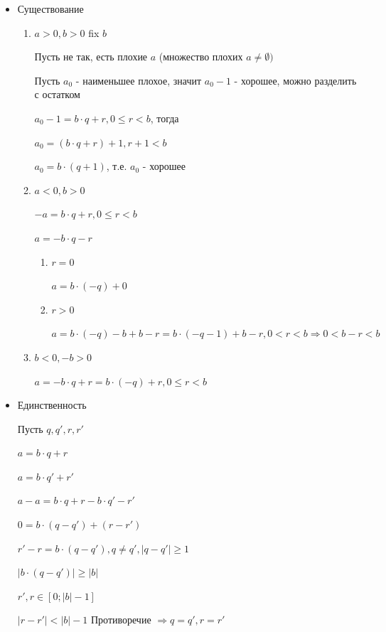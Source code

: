 \documentclass[14pt, letter paper]{article}
\begin{document}
\begin{itemize}
    \item Существование

    \begin{enumerate}
        \item $a > 0, b > 0$ fix $b$

        Пусть не так, есть плохие $a$ (множество плохих $a \neq \emptyset)$

        Пусть $a_0$ - наименьшее плохое, значит $a_0 - 1$ - хорошее, можно разделить с остатком

        $a_0 - 1 = b \cdot q + r, 0 \leq r < b$, тогда 
        
        $a_0 = (b \cdot q + r) + 1, r + 1 < b$

        $a_0 = b \cdot (q + 1)$, т.е. $a_0$ - хорошее

        \item $a < 0, b > 0$

        $-a = b \cdot q + r, 0 \leq r < b$

        $a = -b \cdot q - r$

        \begin{enumerate}
            \item[2.1.] $r = 0$

            $a = b \cdot (-q) + 0$

            \item[2.2.] $r > 0$

            $a = b \cdot (-q) - b + b - r = b \cdot (-q - 1) + b - r, 0 < r < b \Rightarrow 0 < b - r < b$
        \end{enumerate}

        \item $b < 0, -b > 0$

        $a = -b \cdot q + r = b \cdot (-q) + r, 0 \leq r < b$
    \end{enumerate}

    \item Единственность

    Пусть $q, q', r, r'$

    $a = b \cdot q + r$

    $a = b \cdot q' + r'$

    $a - a = b \cdot q + r - b \cdot q' - r'$

    $0 = b \cdot (q - q') + (r - r')$

    $r' - r = b \cdot (q - q'), q \neq q', |q - q'| \geq 1$

    $|b \cdot (q - q')| \geq |b|$

    $r', r \in [0 ; |b| - 1]$

    $|r - r'| < |b| - 1$ Противоречие $\Rightarrow q = q', r = r'$
\end{itemize}
\end{document}
